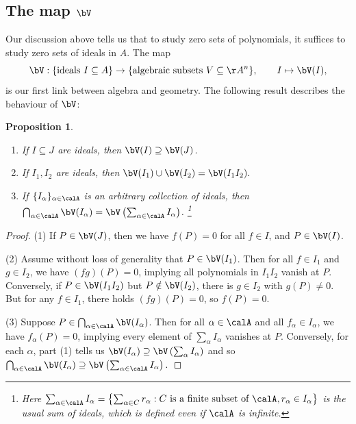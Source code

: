 \documentclass[12pt]{amsart}
\theoremstyle{plain}
\newtheorem{proposition}[theorem]{Proposition}
\begin{document}
\subsection{The map $\bV$}
Our discussion above tells us that to study zero sets of polynomials, it suffices to study zero sets of ideals in $A$.
The map
$$\bV : \{\text{ideals } I \subseteq A\} \to \{\text{algebraic subsets } V \subseteq \AA^n\}, \qquad I \mapsto \bV(I),$$
is our first link between algebra and geometry.
The following result describes the behaviour of $\bV$:

\begin{proposition}\label{vproperties}
\begin{enumerate}
\item If $I \subseteq J$ are ideals, then $\bV(I) \supseteq \bV(J)$.
\item If $I_1, I_2$ are ideals, then $\bV(I_1) \cup \bV(I_2) = \bV(I_1 I_2).$
\item If $\{I_\alpha\}_{\alpha \in \calA}$ is an arbitrary collection of ideals, then $\bigcap_{\alpha \in \calA} \bV(I_\alpha) = \bV\left(\sum_{\alpha \in \calA} I_\alpha\right)$.
\footnote{Here $\sum_{\alpha\in\calA} I_\alpha = \left\{\sum_{\alpha \in C} r_\alpha : C \text{ is a finite subset of } \calA, r_\alpha \in I_\alpha \right\}$ is the usual sum of ideals, which is defined even if $\calA$ is infinite.}
\end{enumerate}
\end{proposition}
\begin{proof}
(1) If $P \in \bV(J)$, then we have $f(P)=0$ for all $f \in I$, and $P \in \bV(I)$.

(2) Assume without loss of generality that $P \in \bV(I_1)$.
Then for all $f \in I_1$ and $g \in I_2$, we have $(fg)(P)=0$, implying all polynomials in $I_1 I_2$ vanish at $P$.
Conversely, if $P \in \bV(I_1 I_2)$ but $P \notin \bV(I_2)$, there is $g \in I_2$ with $g(P) \ne 0$.
But for any $f \in I_1$, there holds $(fg)(P)=0$, so $f(P)=0$.

(3) Suppose $P \in \bigcap_{\alpha \in \calA} \bV(I_\alpha)$.
Then for all $\alpha \in \calA$ and all $f_\alpha \in I_\alpha$, we have $f_\alpha(P) = 0$, implying every element of $\sum_{\alpha} I_\alpha$ vanishes at $P$.
Conversely, for each $\alpha$, part (1) tells us $\bV(I_\alpha) \supseteq \bV\left(\sum_{\alpha} I_\alpha\right)$ and so 
$\bigcap_{\alpha\in\calA} \bV(I_\alpha) \supseteq \bV\left(\sum_{\alpha\in\calA} I_\alpha\right).$
\end{proof}
\end{document}
